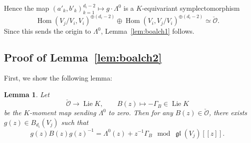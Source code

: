 \documentclass[pdftex]{sigma}
\numberwithin{equation}{section}
\newtheorem{Lemma}[Theorem]{Lemma}
\theoremstyle{definition}
\newcommand{\lemref}[1]{Lemma~\ref{#1}}
\newcommand{\gl}{\operatorname{\mathfrak{gl}}}
\newcommand{\Lie}{\operatorname{Lie}} %
\newcommand{\Hom}{\operatorname{Hom}}
\newcommand{\bO}{\mathcal{O}}
\begin{document}
Hence the map $(a'_k,b'_k)_{k=1}^{d_i-2} \mapsto g \cdot \Lambda^0$
is a $K$-equivariant symplectomorphism
\[
\Hom(V_j/V_i,V_i)^{\oplus (d_i-2)} \oplus \Hom(V_i,V_j/V_i)^{\oplus (d_i-2)}
\simeq \check{\bO}.
\]
Since this sends the origin to $\Lambda^0$,
\lemref{lem:boalch1} follows.

\subsection{Proof of Lemma~\ref{lem:boalch2}}

First, we show the following lemma:

\begin{Lemma}\label{lem:residue}
Let
\[
\check{\bO} \to \Lie K, \qquad B(z) \mapsto -\Gamma_B \in \Lie K
\]
be the $K$-moment map sending $\Lambda^0$ to zero.
Then for any $B(z) \in \check{\bO}$,
there exists $g(z) \in B_{d_i}(V_j)$ such that
\[
g(z)B(z)g(z)^{-1} = \Lambda^0(z) + z^{-1}\Gamma_B
\mod \gl(V_j)[[z]].
\]
\end{Lemma}
\end{document}
